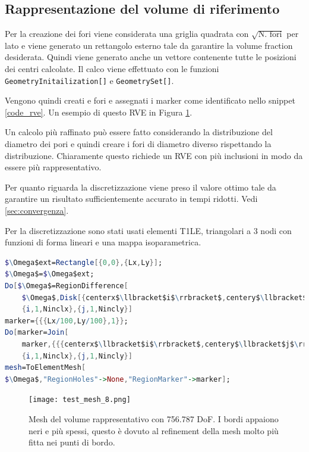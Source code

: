 \documentclass[a4paper,num-refs]{oup-contemporary}
\begin{document}
\subsection{Rappresentazione del volume di riferimento}
\label{sec:RVE_code}

Per la creazione dei fori viene considerata una griglia quadrata con $\sqrt{\text{N. fori}}$ per lato e viene generato un rettangolo esterno tale da garantire la volume fraction desiderata. Quindi viene generato anche un vettore contenente tutte le posizioni dei centri calcolate. Il calco viene effettuato con le funzioni \texttt{GeometryInitailization[]} e \texttt{GeometrySet[]}.

Vengono quindi creati e fori e assegnati i marker come identificato nello snippet \ref{code_rve}.  Un esempio di questo RVE in Figura \ref{fig:Mesh}.

Un calcolo più raffinato può essere fatto considerando la distribuzione del diametro dei pori \citep{Doktor:2011} e quindi creare i fori di diametro diverso rispettando la distribuzione. Chiaramente questo richiede un RVE con più inclusioni in modo da essere più rappresentativo. 

Per quanto riguarda la discretizzazione viene preso il valore ottimo tale da garantire un risultato sufficientemente accurato in tempi ridotti. Vedi \cref{sec:convergenza}.

Per la discretizzazione sono stati usati elementi T1LE, triangolari a 3 nodi con funzioni di forma lineari e una mappa isoparametrica.  

\begin{lstlisting}[language=Mathematica,caption=Generazione RVE,label=code_rve]
$\Omega$ext=Rectangle[{0,0},{Lx,Ly}];
$\Omega$=$\Omega$ext;
Do[$\Omega$=RegionDifference[
	$\Omega$,Disk[{centerx$\llbracket$i$\rrbracket$,centery$\llbracket$j$\rrbracket$},{Rc,Rc}]],
	{i,1,Ninclx},{j,1,Nincly}]
marker={{{Lx/100,Ly/100},1}};
Do[marker=Join[
	marker,{{{centerx$\llbracket$i$\rrbracket$,centery$\llbracket$j$\rrbracket$},2}}],
	{i,1,Ninclx},{j,1,Nincly}]
mesh=ToElementMesh[
$\Omega$,"RegionHoles"->None,"RegionMarker"->marker];	

\end{lstlisting}


\begin{figure}[b!]%
	\centering
	\texttt{[image: test\_mesh\_8.png]}
	\caption{Mesh del volume rappresentativo con 756.787 DoF. I bordi appaiono neri e più spessi, questo è dovuto al refinement della mesh molto più fitta nei punti di bordo.}\label{fig:Mesh}
\end{figure}
\end{document}
